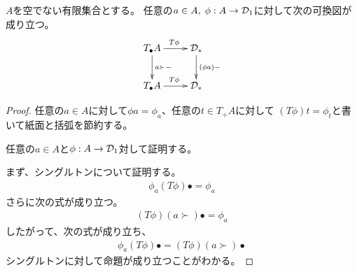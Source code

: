 \begin{proposition}[自然な成長と微分の積との対応]\label{prop:自然な成長と微分の積との対応} %
$A$を空でない有限集合とする。
任意の$a\in A,\;\phi:A\to{\mathcal{D}}_1$に対して次の可換図が成り立つ。
\begin{equation*}\xymatrix{
	T_\bullet A \ar[r]^{T\phi} \ar[d]^{a\succ-}
		& \mycal{D}_* \ar[d]^{(\phi a)-} \\
	T_\bullet A \ar[r]^{T\phi} & \mycal{D}_* \\
}\end{equation*}
\end{proposition} %
\begin{proof} %
任意の$a\in A$に対して$\phi a=\phi_a$、任意の$t\in T_+A$に対して
$(T\phi)t=\phi_t$と書いて紙面と括弧を節約する。

任意の$a\in A$と$\phi:A\to{\mathcal{D}}_1$対して証明する。

まず、シングルトンについて証明する。
\begin{equation*}\begin{split} %
	\phi_a(T\phi)\bullet = \phi_a
\end{split}\end{equation*} %
さらに次の式が成り立つ。
\begin{equation*}\begin{split} %
	(T\phi)(a\succ)\bullet = \phi_a
\end{split}\end{equation*} %
したがって、次の式が成り立ち、
\begin{equation*}\begin{split} %
	\phi_a(T\phi)\bullet = (T\phi)(a\succ)\bullet
\end{split}\end{equation*} %
シングルトンに対して命題が成り立つことがわかる。


\end{proof}
